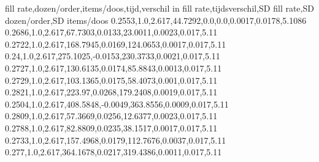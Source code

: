 fill rate,dozen/order,items/doos,tijd,verschil in fill rate,tijdsverschil,SD fill rate,SD dozen/order,SD items/doos
0.2553,1.0,2.617,44.7292,0.0,0.0,0.0017,0.0178,5.1086
0.2686,1.0,2.617,67.7303,0.0133,23.0011,0.0023,0.017,5.11
0.2722,1.0,2.617,168.7945,0.0169,124.0653,0.0017,0.017,5.11
0.24,1.0,2.617,275.1025,-0.0153,230.3733,0.0021,0.017,5.11
0.2727,1.0,2.617,130.6135,0.0174,85.8843,0.0013,0.017,5.11
0.2729,1.0,2.617,103.1365,0.0175,58.4073,0.001,0.017,5.11
0.2821,1.0,2.617,223.97,0.0268,179.2408,0.0019,0.017,5.11
0.2504,1.0,2.617,408.5848,-0.0049,363.8556,0.0009,0.017,5.11
0.2809,1.0,2.617,57.3669,0.0256,12.6377,0.0023,0.017,5.11
0.2788,1.0,2.617,82.8809,0.0235,38.1517,0.0017,0.017,5.11
0.2733,1.0,2.617,157.4968,0.0179,112.7676,0.0037,0.017,5.11
0.277,1.0,2.617,364.1678,0.0217,319.4386,0.0011,0.017,5.11
